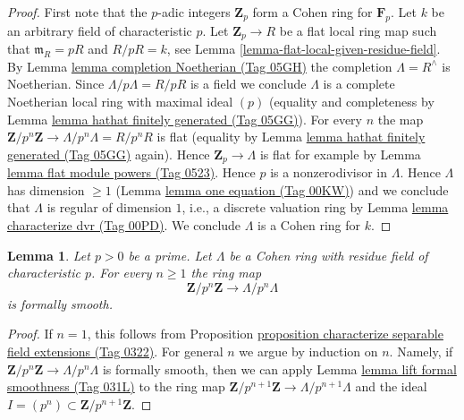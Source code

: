 \documentclass{amsart}
\theoremstyle{plain}
\newtheorem{lemma}[subsection]{Lemma}
\theoremstyle{definition}
\theoremstyle{remark}
\numberwithin{equation}{subsection}
\begin{document}
\begin{proof}
First note that the $p$-adic integers $\mathbf{Z}_p$ form a Cohen ring
for $\mathbf{F}_p$. Let $k$ be an arbitrary field of characteristic $p$.
Let $\mathbf{Z}_p \to R$ be a flat local ring map such that
$\mathfrak m_R = pR$ and $R/pR = k$, see
Lemma \ref{lemma-flat-local-given-residue-field}.
By Lemma \href{https://stacks.math.columbia.edu/tag/05GH}{lemma completion Noetherian (Tag 05GH)} the completion
$\Lambda = R^\wedge$ is Noetherian. Since $\Lambda/p\Lambda = R/pR$
is a field we conclude $\Lambda$ is a
complete Noetherian local ring with maximal ideal $(p)$
(equality and completeness by Lemma \href{https://stacks.math.columbia.edu/tag/05GG}{lemma hathat finitely generated (Tag 05GG)}).
For every $n$ the map $\mathbf{Z}/p^n\mathbf{Z} \to \Lambda/p^n\Lambda = R/p^nR$
is flat (equality by Lemma \href{https://stacks.math.columbia.edu/tag/05GG}{lemma hathat finitely generated (Tag 05GG)} again).
Hence $\mathbf{Z}_p \to \Lambda$ is flat for example by
Lemma \href{https://stacks.math.columbia.edu/tag/0523}{lemma flat module powers (Tag 0523)}. Hence $p$ is a
nonzerodivisor in $\Lambda$. Hence $\Lambda$ has dimension $\geq 1$
(Lemma \href{https://stacks.math.columbia.edu/tag/00KW}{lemma one equation (Tag 00KW)})
and we conclude that $\Lambda$ is regular of dimension $1$, i.e.,
a discrete valuation ring by Lemma \href{https://stacks.math.columbia.edu/tag/00PD}{lemma characterize dvr (Tag 00PD)}.
We conclude $\Lambda$ is a Cohen ring for $k$.
\end{proof}

\begin{lemma}
\label{lemma-cohen-ring-formally-smooth}
Let $p > 0$ be a prime.
Let $\Lambda$ be a Cohen ring with residue field of characteristic $p$.
For every $n \geq 1$ the ring map
$$
\mathbf{Z}/p^n\mathbf{Z} \to \Lambda/p^n\Lambda
$$
is formally smooth.
\end{lemma}

\begin{proof}
If $n = 1$, this follows from
Proposition \href{https://stacks.math.columbia.edu/tag/0322}{proposition characterize separable field extensions (Tag 0322)}.
For general $n$ we argue by induction on $n$.
Namely, if $\mathbf{Z}/p^n\mathbf{Z} \to \Lambda/p^n\Lambda$ is
formally smooth, then we can apply Lemma \href{https://stacks.math.columbia.edu/tag/031L}{lemma lift formal smoothness (Tag 031L)}
to the ring map
$\mathbf{Z}/p^{n + 1}\mathbf{Z} \to \Lambda/p^{n + 1}\Lambda$
and the ideal $I = (p^n) \subset \mathbf{Z}/p^{n + 1}\mathbf{Z}$.
\end{proof}
\end{document}

